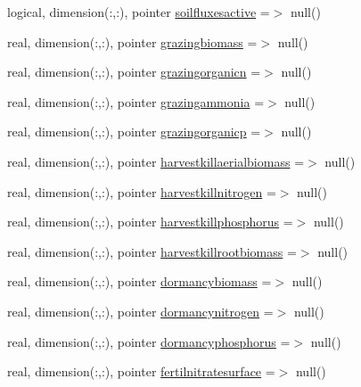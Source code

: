 \begin{DoxyCompactItemize}
\item 
logical, dimension(\+:,\+:), pointer \mbox{\hyperlink{structmoduleporousmediaproperties_1_1t__extvar_a8859225e4fe721e3b75a23f48084045b}{soilfluxesactive}} =$>$ null()
\item 
real, dimension(\+:,\+:), pointer \mbox{\hyperlink{structmoduleporousmediaproperties_1_1t__extvar_a6fefe0f8fc8c2ee06ff2b74e32aa9932}{grazingbiomass}} =$>$ null()
\item 
real, dimension(\+:,\+:), pointer \mbox{\hyperlink{structmoduleporousmediaproperties_1_1t__extvar_a48555ec8f6d78d7c36ffea9888bc1a4e}{grazingorganicn}} =$>$ null()
\item 
real, dimension(\+:,\+:), pointer \mbox{\hyperlink{structmoduleporousmediaproperties_1_1t__extvar_a277e4352c7ca3830a789d8fc445e26a5}{grazingammonia}} =$>$ null()
\item 
real, dimension(\+:,\+:), pointer \mbox{\hyperlink{structmoduleporousmediaproperties_1_1t__extvar_abc7e677206510606dc3d51bfc26c37c5}{grazingorganicp}} =$>$ null()
\item 
real, dimension(\+:,\+:), pointer \mbox{\hyperlink{structmoduleporousmediaproperties_1_1t__extvar_a039a9039b52807471b1fb440750bba53}{harvestkillaerialbiomass}} =$>$ null()
\item 
real, dimension(\+:,\+:), pointer \mbox{\hyperlink{structmoduleporousmediaproperties_1_1t__extvar_aae16f8cfc6fb129d47874ad082524821}{harvestkillnitrogen}} =$>$ null()
\item 
real, dimension(\+:,\+:), pointer \mbox{\hyperlink{structmoduleporousmediaproperties_1_1t__extvar_afa261a6af5587784fefb53512da03841}{harvestkillphosphorus}} =$>$ null()
\item 
real, dimension(\+:,\+:), pointer \mbox{\hyperlink{structmoduleporousmediaproperties_1_1t__extvar_a1a2e955863e2d51687c9506c1b14d80a}{harvestkillrootbiomass}} =$>$ null()
\item 
real, dimension(\+:,\+:), pointer \mbox{\hyperlink{structmoduleporousmediaproperties_1_1t__extvar_acda9f965854ed9329d312dc045381de1}{dormancybiomass}} =$>$ null()
\item 
real, dimension(\+:,\+:), pointer \mbox{\hyperlink{structmoduleporousmediaproperties_1_1t__extvar_afc295612d8731c68f4a7735096bdbd05}{dormancynitrogen}} =$>$ null()
\item 
real, dimension(\+:,\+:), pointer \mbox{\hyperlink{structmoduleporousmediaproperties_1_1t__extvar_ab188fe05c3aa7b678ee118fcf42f7b64}{dormancyphosphorus}} =$>$ null()
\item 
real, dimension(\+:,\+:), pointer \mbox{\hyperlink{structmoduleporousmediaproperties_1_1t__extvar_a0a8ae693be98e648b206c23cfda016c2}{fertilnitratesurface}} =$>$ null()

\end{DoxyCompactItemize}
